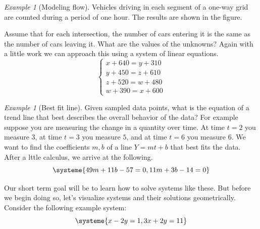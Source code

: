 \documentclass[11pt,oneside]{amsbook}
\theoremstyle{definition}
\theoremstyle{plain}
\theoremstyle{definition}
\theoremstyle{remark}
\newtheorem{example}[theorem]{Example}
\numberwithin{equation}{section}
\numberwithin{figure}{section}
\begin{document}
\begin{example}[Modeling flow]
  Vehicles driving in each segment of a one-way grid are counted during a period of one hour. The results are shown in the figure.
  \begin{center}
  \end{center}
  Assume that for each intersection, the number of cars entering it is the same as the number of cars leaving it. What are the values of the unknowns? Again with a little work we can approach this using a system of linear equations.
  \[\begin{cases}x+640=y+310\\y+450=z+610\\z+520=w+480\\w+390=x+600\end{cases}
  \]
\end{example}

\begin{example}[Best fit line]
  Given sampled data points, what is the equation of a trend line that best describes the overall behavior of the data? For example suppose you are measuring the change in a quantity over time. At time $t=2$ you measure $3$, at time $t=3$ you measure $5$, and at time $t=6$ you measure $6$. We want to find the coefficients $m,b$ of a line $Y=mt+b$ that best fits the data. After a lttle calculus, we arrive at the following.
  \[\systeme{49m+11b-57=0,11m+3b-14=0}
  \]
\end{example}
  
Our short term goal will be to learn how to solve systems like these. But before we begin doing so, let's visualize systems and their solutions geometrically. Consider the following example system:
\[\systeme{x-2y=1,3x+2y=11}
\]
\end{document}
